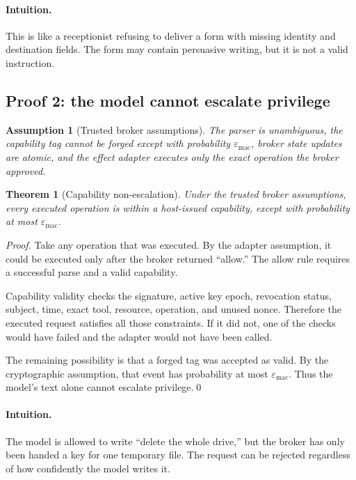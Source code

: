 \documentclass[11pt]{article}
\newtheorem{assumption}[definition]{Assumption}
\newtheorem{theorem}[definition]{Theorem}
\begin{document}
\paragraph{Intuition.} This is like a receptionist refusing to deliver a form with missing identity and destination fields. The form may contain persuasive writing, but it is not a valid instruction.

\subsection{Proof 2: the model cannot escalate privilege}
\begin{assumption}[Trusted broker assumptions]
The parser is unambiguous, the capability tag cannot be forged except with probability $\varepsilon_{\mathrm{mac}}$, broker state updates are atomic, and the effect adapter executes only the exact operation the broker approved.
\end{assumption}

\begin{theorem}[Capability non-escalation]
Under the trusted broker assumptions, every executed operation is within a host-issued capability, except with probability at most $\varepsilon_{\mathrm{mac}}$.
\end{theorem}
\begin{proof}
Take any operation that was executed. By the adapter assumption, it could be executed only after the broker returned ``allow.'' The allow rule requires a successful parse and a valid capability.

Capability validity checks the signature, active key epoch, revocation status, subject, time, exact tool, resource, operation, and unused nonce. Therefore the executed request satisfies all those constraints. If it did not, one of the checks would have failed and the adapter would not have been called.

The remaining possibility is that a forged tag was accepted as valid. By the cryptographic assumption, that event has probability at most $\varepsilon_{\mathrm{mac}}$. Thus the model's text alone cannot escalate privilege.\qed
\end{proof}

\paragraph{Intuition.} The model is allowed to write ``delete the whole drive,'' but the broker has only been handed a key for one temporary file. The request can be rejected regardless of how confidently the model writes it.
\end{document}
